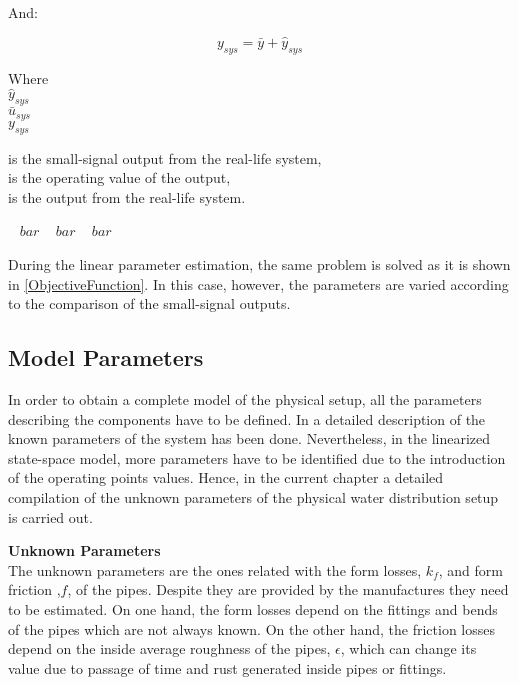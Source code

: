 And:

\begin{equation}
  y_{sys} = \bar{y} + \hat{y}_{sys} 
 \label{u_smallsignal}
\end{equation}

\begin{minipage}[t]{0.20\textwidth}
Where\\
\hspace*{8mm} $\hat{y}_{sys}$ \\
\hspace*{8mm} $\bar{u}_{sys}$ \\
\hspace*{8mm} $y_{sys}$ 
\end{minipage}
\begin{minipage}[t]{0.68\textwidth}
\vspace*{2mm}
is the small-signal output from the real-life system, \\
is the operating value of the output,\\
is the output from the real-life system. 
\end{minipage}
\begin{minipage}[t]{0.10\textwidth}
\vspace*{2mm}
\textcolor{White}{te}$\unit{bar}$
\textcolor{White}{te}$\unit{bar}$
\textcolor{White}{te}$\unit{bar}$
\end{minipage} 

During the linear parameter estimation, the same problem is solved as it is shown in \eqref{ObjectiveFunction}. In this case, however, the parameters are varied according to the comparison of the small-signal outputs.  

\subsection{Model Parameters}
\label{estimateParameters}
In order to obtain a complete model of the physical setup, all the parameters describing the components have to be defined. In  a detailed
description of the known parameters of the system has been done. Nevertheless, in the linearized state-space model, more parameters have to be identified
due to the introduction of the operating points values. Hence, in the current chapter a detailed compilation of the unknown parameters of the physical water distribution setup is carried out.


\textbf{Unknown Parameters}\\
The unknown parameters are the ones related with the form losses, $k_f$, and form friction ,$f$, of the pipes. Despite they are 
provided by the manufactures they need to be estimated. On one hand, the form losses depend on the fittings and bends of the pipes which are not always known. 
On the other hand, the friction losses depend on the inside average roughness of the pipes, $\epsilon$, which can change its value due to passage of time 
and rust generated inside pipes or fittings. 

